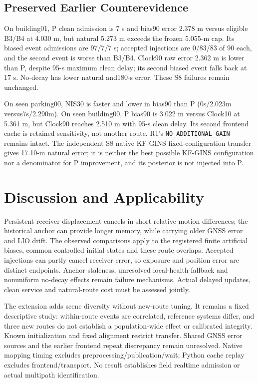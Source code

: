 \documentclass[conference]{IEEEtran}
\begin{document}
\subsection{Preserved Earlier Counterevidence}
On building01, P clean admission is 7 s and bias90 error 2.378 m versus eligible B3/B4 at 4.030 m, but natural 5.273 m exceeds the frozen 5.055-m cap. Its biased event admissions are 97/7/7 s; accepted injections are 0/83/83 of 90 each, and the second event is worse than B3/B4. Clock90 raw error 2.362 m is lower than P, despite 95-s maximum clean delay; its second biased event falls back at 17 s. No-decay has lower natural and180-s error. These S8 failures remain unchanged.

On seen parking00, NIS30 is faster and lower in bias90 than P (0s/2.023m versus7s/2.290m). On seen building00, P bias90 is 3.022 m versus Clock10 at 5.361 m, but Clock90 reaches 2.510 m with 95-s clean delay. Its second frontend cache is retained sensitivity, not another route. R1's \texttt{NO\_ADDITIONAL\_GAIN} remains intact. The independent S8 native KF-GINS fixed-configuration transfer gives 17.10-m natural error; it is neither the best possible KF-GINS configuration nor a denominator for P improvement, and its posterior is not injected into P.

\section{Discussion and Applicability}
Persistent receiver displacement cancels in short relative-motion differences; the historical anchor can provide longer memory, while carrying older GNSS error and LIO drift. The observed comparisons apply to the registered finite artificial biases, common controlled initial states and these route overlaps. Accepted injections can partly cancel receiver error, so exposure and position error are distinct endpoints. Anchor staleness, unresolved local-health fallback and nonuniform no-decay effects remain failure mechanisms. Actual delayed updates, clean service and natural-route cost must be assessed jointly.

The extension adds scene diversity without new-route tuning. It remains a fixed descriptive study: within-route events are correlated, reference systems differ, and three new routes do not establish a population-wide effect or calibrated integrity. Known initialization and fixed alignment restrict transfer. Shared GNSS error sources and the earlier frontend repeat discrepancy remain unresolved. Native mapping timing excludes preprocessing/publication/wait; Python cache replay excludes frontend/transport. No result establishes field realtime admission or actual multipath identification.
\end{document}
